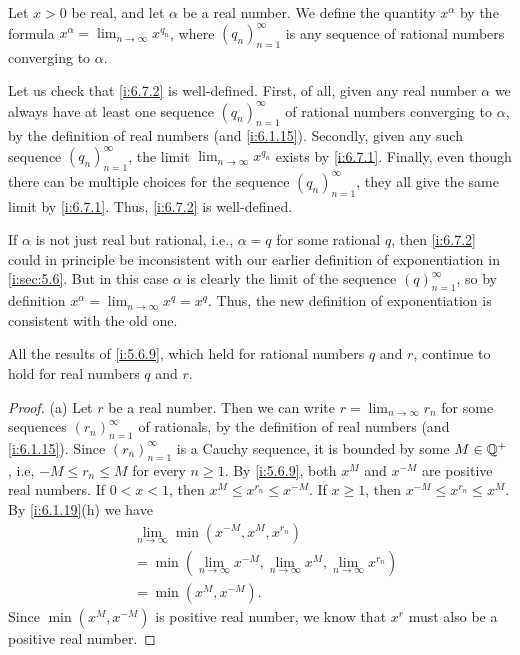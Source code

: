 \begin{defn}\label{i:6.7.2}
  Let \(x > 0\) be real, and let \(\alpha\) be a real number.
  We define the quantity \(x^\alpha\) by the formula \(x^\alpha = \lim_{n \to \infty} x^{q_n}\), where \((q_n)_{n = 1}^\infty\) is any sequence of rational numbers converging to \(\alpha\).
\end{defn}

\begin{note}
  Let us check that \cref{i:6.7.2} is well-defined.
  First, of all, given any real number \(\alpha\) we always have at least one sequence \((q_n)_{n = 1}^\infty\) of rational numbers converging to \(\alpha\), by the definition of real numbers (and \cref{i:6.1.15}).
  Secondly, given any such sequence \((q_n)_{n = 1}^\infty\), the limit \(\lim_{n \to \infty} x^{q_n}\) exists by \cref{i:6.7.1}.
  Finally, even though there can be multiple choices for the sequence \((q_n)_{n = 1}^\infty\), they all give the same limit by \cref{i:6.7.1}.
  Thus, \cref{i:6.7.2} is well-defined.
\end{note}

\begin{note}
  If \(\alpha\) is not just real but rational, i.e., \(\alpha = q\) for some rational \(q\), then \cref{i:6.7.2} could in principle be inconsistent with our earlier definition of exponentiation in \cref{i:sec:5.6}.
  But in this case \(\alpha\) is clearly the limit of the sequence \((q)_{n = 1}^\infty\), so by definition \(x^\alpha = \lim_{n \to \infty} x^q = x^q\).
  Thus, the new definition of exponentiation is consistent with the old one.
\end{note}

\begin{prop}\label{i:6.7.3}
  All the results of \cref{i:5.6.9}, which held for rational numbers \(q\) and \(r\), continue to hold for real numbers \(q\) and \(r\).
\end{prop}

\begin{proof}{(a)}
  Let \(r\) be a real number.
  Then we can write \(r = \lim_{n \to \infty} r_n\) for some sequences \((r_n)_{n = 1}^\infty\) of rationals, by the definition of real numbers (and \cref{i:6.1.15}).
  Since \((r_n)_{n = 1}^\infty\) is a Cauchy sequence, it is bounded by some \(M \in \mathbb{Q}^+\), i.e, \(-M \leq r_n \leq M\) for every \(n \geq 1\).
  By \cref{i:5.6.9}, both \(x^M\) and \(x^{-M}\) are positive real numbers.
  If \(0 < x < 1\), then \(x^M \leq x^{r_n} \leq x^{-M}\).
  If \(x \geq 1\), then \(x^{-M} \leq x^{r_n} \leq x^M\).
  By \cref{i:6.1.19}(h) we have
  \begin{align*}
     & \lim_{n \to \infty} \min(x^{-M}, x^M, x^{r_n})                                           \\
     & = \min(\lim_{n \to \infty} x^{-M}, \lim_{n \to \infty} x^M, \lim_{n \to \infty} x^{r_n}) \\
     & = \min(x^M, x^{-M}).
  \end{align*}
  Since \(\min(x^M, x^{-M})\) is positive real number, we know that \(x^r\) must also be a positive real number.
\end{proof}

